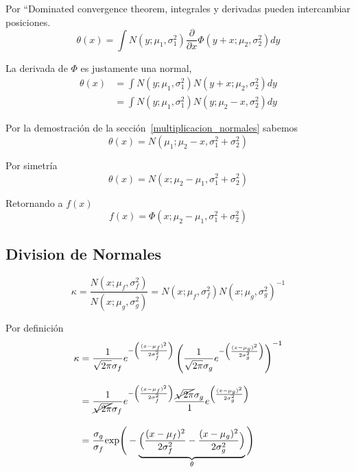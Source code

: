 \documentclass[article]{jss}
\begin{document}
\begin{appendix}
Por ``Dominated convergence theorem, integrales y derivadas pueden intercambiar posiciones.
\begin{equation}
 \theta(x) = \int N(y;\mu_1,\sigma_1^2)\frac{\partial}{\partial x}\Phi(y+x;\mu_2,\sigma_2^2) dy
\end{equation}

La derivada de $\Phi$ es justamente una normal,
\begin{equation}
\begin{split}
\theta(x) & = \int N(y;\mu_1,\sigma_1^2)N(y+x;\mu_2,\sigma_2^2) dy \\
& = \int N(y;\mu_1,\sigma_1^2)N(y;\mu_2-x,\sigma_2^2) dy
\end{split}
\end{equation}

Por la demostraci\'on de la secci\'on~\ref{multiplicacion_normales} sabemos
\begin{equation}
 \theta(x) = N(\mu_1; \mu_2 - x, \sigma_1^2 + \sigma_2^2)
\end{equation}

Por simetr\'ia
\begin{equation}
 \theta(x) = N(x; \mu_2 - \mu_1, \sigma_1^2 + \sigma_2^2)
\end{equation}

Retornando a $f(x)$
\begin{equation}
 f(x) = \Phi(x; \mu_2 - \mu_1, \sigma_1^2 + \sigma_2^2)
\end{equation}

\subsection{Division de Normales}\label{sec:division_normales}

\begin{equation}
\kappa = \frac{N(x;\mu_f,\sigma_f^2)}{N(x;\mu_g,\sigma_g^2)} = N(x;\mu_f,\sigma_f^2)N(x;\mu_g,\sigma_g^2)^{-1}
\end{equation}

Por definici\'on
\begin{equation}
\begin{split}
\kappa & = \frac{1}{\sqrt{2\pi}\sigma_f}e^{-\left(\frac{(x-\mu_f)^2}{2\sigma_f^2}\right)} \left( \frac{1}{\sqrt{2\pi}\sigma_g}e^{-\left(\frac{(x-\mu_g)^2}{2\sigma_g^2}\right)} \right)^{-1} \\[0.3cm]
& = \frac{1}{\cancel{\sqrt{2\pi}}\sigma_f}e^{-\left(\frac{(x-\mu_f)^2}{2\sigma_f^2}\right)} \frac{\cancel{\sqrt{2\pi}}\sigma_g}{1} e^{\left(\frac{(x-\mu_g)^2}{2\sigma_g^2}\right)} \\[0.3cm]
& = \frac{\sigma_g}{\sigma_f}\text{exp}\Bigg(-\underbrace{\Big(\frac{(x-\mu_f)^2}{2\sigma_f^2} - \frac{(x-\mu_g)^2}{2\sigma_g^2}\Big)}_{\theta}\Bigg)
\end{split}
\end{equation}


\end{appendix}
\end{document}

